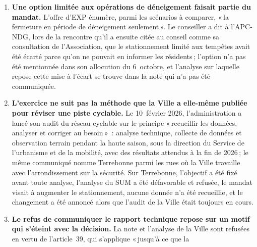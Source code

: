 \documentclass[10pt,letterpaper]{article}
\begin{document}
\begin{enumerate}[nosep,itemsep=0.3em,leftmargin=1.4em]
\begin{minipage}[t]{\linewidth}
    cycliste, l'espace de dépassement et le matériel de déneigement, dont
    aucun ne dépend du nombre de personnes qui roulent\,; rien au dossier ne
    décrit les pistes actuelles comme plus larges que la norme ne
    l'exige.\end{minipage}\vspace{0.35em}
\item \begin{minipage}[t]{\linewidth}\textbf{Une option limitée aux opérations de déneigement
    faisait partie du mandat.} L'offre d'EXP énumère, parmi les scénarios à
    comparer, «\,la fermeture en période de déneigement seulement\,». Le
    conseiller a dit à l'APC-NDG, lors de la rencontre qu'il a ensuite citée
    au conseil comme sa consultation de l'Association, que le stationnement
    limité aux tempêtes avait été écarté parce qu'on ne pouvait en informer
    les résidents\,; l'option n'a pas été mentionnée dans son allocution du
    6~octobre, et l'analyse sur laquelle repose cette mise à l'écart se
    trouve dans la note qui n'a pas été communiquée.\end{minipage}\vspace{0.35em}
\item \begin{minipage}[t]{\linewidth}\textbf{L'exercice ne suit pas la méthode que la Ville a elle-même
    publiée pour réviser une piste cyclable.} Le 10~février 2026,
    l'administration a lancé son audit du réseau cyclable sur le principe
    «\,recueillir les données, analyser et corriger au besoin\,»~: analyse
    technique, collecte de données et observation terrain pendant la haute
    saison, sous la direction du Service de l'urbanisme et de la mobilité,
    avec des résultats attendus à la fin de 2026\,; le même communiqué nomme
    Terrebonne parmi les rues où la Ville travaille avec l'arrondissement sur
    la sécurité. Sur Terrebonne, l'objectif a été fixé avant toute analyse,
    l'analyse du SUM a été défavorable et refusée, le mandat visait à
    augmenter le stationnement, aucune donnée n'a été recueillie, et le
    changement a été annoncé alors que l'audit de la Ville était toujours en
    cours.\end{minipage}\vspace{0.35em}
\item \begin{minipage}[t]{\linewidth}\textbf{Le refus de communiquer le rapport technique repose sur un
    motif qui s'éteint avec la décision.} La note et l'analyse de la Ville sont
    refusées en vertu de l'article~39, qui s'applique «\,jusqu'à ce que la

\end{minipage}
\end{enumerate}
\end{document}
